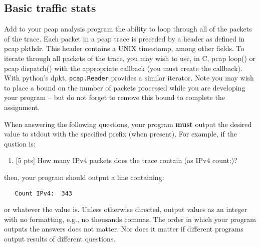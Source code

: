\subsection{Basic traffic stats}
Add to your pcap analysis program the ability to loop through all of the packets of the trace. Each packet in a pcap trace is preceded by a header as defined in pcap pkthdr. This header contains a UNIX timestamp, among other fields. To iterate through all packets of the trace, you may wish to use, in C, pcap loop() or pcap dispatch() with the appropriate callback (you must create the callback). With python's dpkt, {\tt pcap.Reader} provides a similar iterator.  Note you may wish to place a bound on the number
of packets processed while you are developing your program -- but do not forget to remove this bound to complete the 
assignment.

When answering the following questions, your program \textbf{must} output the desired value to stdout with the specified prefix
(when present).
For example, if the qustion is:
\begin{enumerate}
\item {[5 pts]} How many IPv4 packets does the trace contain (as IPv4 count:)?
\end{enumerate}
\noindent then, your program should output a line  containing:
\begin{verbatim}
   Count IPv4:  343
\end{verbatim}
\noindent or whatever the value is.  Unless otherwise directed, output values as 
an integer with no formatting, e.g., no thousands commas.  
The order in which your program outputs the answers does not matter.  Nor does it matter
if different programs output results of different questions.

